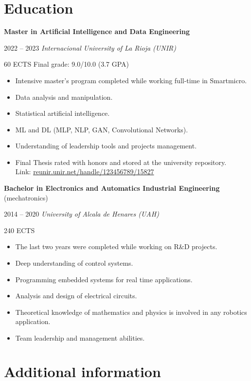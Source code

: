 \documentclass[10pt,a4paper]{article}
\newcommand{\link}[2]{\href{#1}{\textcolor{linkblue}{#2}}}
\begin{document}
\section{Education}

\textbf{Master in Artificial Intelligence and Data Engineering}\par
2022 -- 2023 \textit{Internacional University of La Rioja (UNIR)}\par
60 ECTS Final grade: 9.0/10.0 (3.7 GPA)
\begin{itemize}
  \item Intensive master's program completed while working full-time in Smartmicro.
  \item Data analysis and manipulation.
  \item Statistical artificial intelligence.
  \item ML and DL (MLP, NLP, GAN, Convolutional Networks).
  \item Understanding of leadership tools and projects management.
  \item Final Thesis rated with honors and stored at the university repository.\\
        Link: \link{https://reunir.unir.net/handle/123456789/15827}{reunir.unir.net/handle/123456789/15827}
\end{itemize}

\vspace{0.7em}
\textbf{Bachelor in Electronics and Automatics Industrial Engineering} (mechatronics)\par
2014 -- 2020 \textit{University of Alcala de Henares (UAH)}\par
240 ECTS
\begin{itemize}
  \item The last two years were completed while working on R\&D projects.
  \item Deep understanding of control systems.
  \item Programming embedded systems for real time applications.
  \item Analysis and design of electrical circuits.
  \item Theoretical knowledge of mathematics and physics is involved in any robotics application.
  \item Team leadership and management abilities.
\end{itemize}

\section{Additional information}
\end{document}
